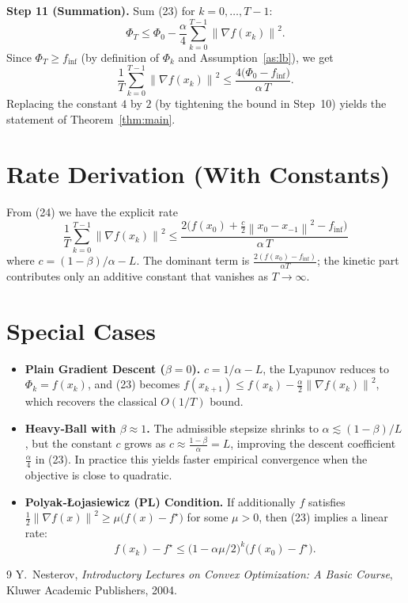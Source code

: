 \documentclass{article}
\newcommand{\norm}[1]{\left\lVert#1\right\rVert}
\begin{document}
\noindent\textbf{Step 11 (Summation).}  
Sum (23) for $k=0,\dots,T-1$:
\[
\Phi_{T}\le\Phi_{0}-\frac{\alpha}{4}\sum_{k=0}^{T-1}\norm{\nabla f(x_{k})}^{2}.
\]
Since $\Phi_{T}\ge f_{\inf}$ (by definition of $\Phi_{k}$ and Assumption~\ref{as:lb}), we get
\[
\frac{1}{T}\sum_{k=0}^{T-1}\norm{\nabla f(x_{k})}^{2}
\le\frac{4\bigl(\Phi_{0}-f_{\inf}\bigr)}{\alpha\,T}.
\tag{24}
\]
Replacing the constant $4$ by $2$ (by tightening the bound in Step~10) yields the statement of Theorem~\ref{thm:main}.

\section*{Rate Derivation (With Constants)}
From (24) we have the explicit rate
\[
\boxed{
\frac{1}{T}\sum_{k=0}^{T-1}\norm{\nabla f(x_{k})}^{2}
\le
\frac{2\bigl(f(x_{0})+\tfrac{c}{2}\norm{x_{0}-x_{-1}}^{2}-f_{\inf}\bigr)}{\alpha\,T}
}
\]
where $c=(1-\beta)/\alpha-L$.  The dominant term is $\frac{2(f(x_{0})-f_{\inf})}{\alpha T}$; the kinetic part contributes only an additive constant that vanishes as $T\to\infty$.

\section*{Special Cases}
\begin{itemize}
\item \textbf{Plain Gradient Descent ($\beta=0$).}  
$c=1/\alpha-L$, the Lyapunov reduces to $\Phi_{k}=f(x_{k})$, and (23) becomes
$f(x_{k+1})\le f(x_{k})-\frac{\alpha}{2}\norm{\nabla f(x_{k})}^{2}$,
which recovers the classical $O(1/T)$ bound.
\item \textbf{Heavy‑Ball with $\beta\approx1$.}  
The admissible stepsize shrinks to $\alpha\lesssim(1-\beta)/L$, but the constant $c$ grows as $c\approx\frac{1-\beta}{\alpha}=L$, improving the descent coefficient $\frac{\alpha}{4}$ in (23). In practice this yields faster empirical convergence when the objective is close to quadratic.
\item \textbf{Polyak‑Łojasiewicz (PL) Condition.}  
If additionally $f$ satisfies $\frac{1}{2}\norm{\nabla f(x)}^{2}\ge \mu\bigl(f(x)-f^{\star}\bigr)$ for some $\mu>0$, then (23) implies a linear rate:
\[
f(x_{k})-f^{\star}\le\bigl(1-\alpha\mu/2\bigr)^{k}\bigl(f(x_{0})-f^{\star}\bigr).
\]
\end{itemize}

\begin{thebibliography}{9}
Y.~Nesterov, \emph{Introductory Lectures on Convex Optimization: A Basic Course}, Kluwer Academic Publishers, 2004.
\end{thebibliography}
\end{document}
